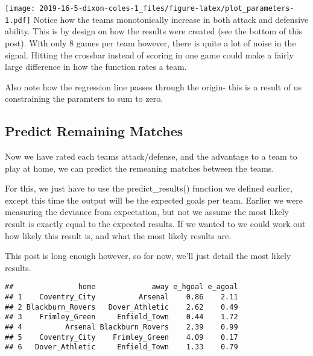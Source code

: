 \documentclass[]{article}
\newenvironment{Shaded}{\begin{snugshade}}{\end{snugshade}}
\newcommand{\KeywordTok}[1]{\textcolor[rgb]{0.13,0.29,0.53}{\textbf{#1}}}
\newcommand{\DecValTok}[1]{\textcolor[rgb]{0.00,0.00,0.81}{#1}}
\newcommand{\StringTok}[1]{\textcolor[rgb]{0.31,0.60,0.02}{#1}}
\newcommand{\OperatorTok}[1]{\textcolor[rgb]{0.81,0.36,0.00}{\textbf{#1}}}
\newcommand{\NormalTok}[1]{#1}
\begin{document}
\texttt{[image: 2019-16-5-dixon-coles-1\_files/figure-latex/plot\_parameters-1.pdf]}
Notice how the teams monotonically increase in both attack and defensive
ability. This is by design on how the results were created (see the
bottom of this post). With only 8 games per team however, there is quite
a lot of noise in the signal. Hitting the crossbar instead of scoring in
one game could make a fairly large difference in how the function rates
a team.

Also note how the regression line passes through the origin- this is a
result of us constraining the paramters to sum to zero.

\subsection{Predict Remaining Matches}\label{predict-remaining-matches}

Now we have rated each teams attack/defense, and the advantage to a team
to play at home, we can predict the remeaning matches between the teams.

For this, we just have to use the predict\_results() function we defined
earlier, except this time the output will be the expected goals per
team. Earlier we were measuring the deviance from expectation, but not
we assume the most likely result is exactly equal to the expected
results. If we wanted to we could work out how likely this result is,
and what the most likely results are.

This post is long enough however, so for now, we'll just detail the most
likely results.

\begin{Shaded}
\end{Shaded}

\begin{verbatim}
##               home             away e_hgoal e_agoal
## 1    Coventry_City          Arsenal    0.86    2.11
## 2 Blackburn_Rovers   Dover_Athletic    2.62    0.49
## 3    Frimley_Green     Enfield_Town    0.44    1.72
## 4          Arsenal Blackburn_Rovers    2.39    0.99
## 5    Coventry_City    Frimley_Green    4.09    0.17
## 6   Dover_Athletic     Enfield_Town    1.33    0.79
\end{verbatim}
\end{document}
